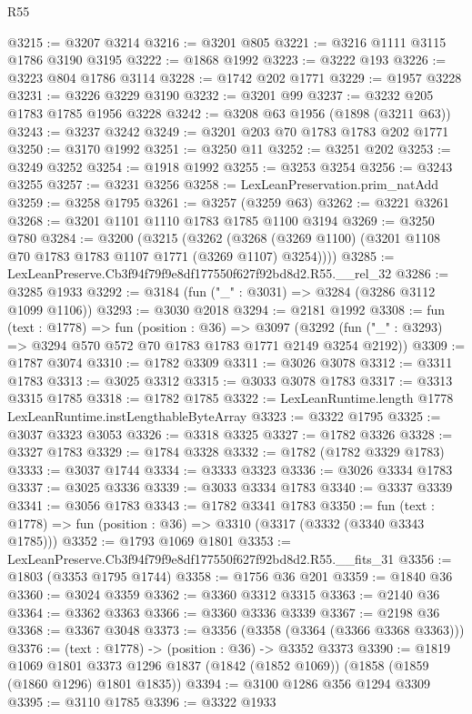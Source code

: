 \begin{lexlean}{R55}
\begin{coremodule}
@3215 := @3207 @3214
@3216 := @3201 @805
@3221 := @3216 @1111 @3115 @1786 @3190 @3195
@3222 := @1868 @1992
@3223 := @3222 @193
@3226 := @3223 @804 @1786 @3114
@3228 := @1742 @202 @1771
@3229 := @1957 @3228
@3231 := @3226 @3229 @3190
@3232 := @3201 @99
@3237 := @3232 @205 @1783 @1785 @1956 @3228
@3242 := @3208 @63 @1956 (@1898 (@3211 @63))
@3243 := @3237 @3242
@3249 := @3201 @203 @70 @1783 @1783 @202 @1771
@3250 := @3170 @1992
@3251 := @3250 @11
@3252 := @3251 @202
@3253 := @3249 @3252
@3254 := @1918 @1992
@3255 := @3253 @3254
@3256 := @3243 @3255
@3257 := @3231 @3256
@3258 := LexLeanPreservation.prim_natAdd
@3259 := @3258 @1795
@3261 := @3257 (@3259 @63)
@3262 := @3221 @3261
@3268 := @3201 @1101 @1110 @1783 @1785 @1100 @3194
@3269 := @3250 @780
@3284 := @3200
    (@3215
      (@3262 (@3268 (@3269 @1100) (@3201 @1108 @70 @1783 @1783 @1107 @1771 (@3269 @1107) @3254))))
@3285 := LexLeanPreserve.Cb3f94f79f9e8df177550f627f92bd8d2.R55.__rel_32
@3286 := @3285 @1933
@3292 := @3184 (fun ("_" : @3031) => @3284 (@3286 @3112 @1099 @1106))
@3293 := @3030 @2018
@3294 := @2181 @1992
@3308 := fun (text : @1778) =>
  fun (position : @36) =>
  @3097 (@3292 (fun ("_" : @3293) => @3294 @570 @572 @70 @1783 @1783 @1771 @2149 @3254 @2192))
@3309 := @1787 @3074
@3310 := @1782 @3309
@3311 := @3026 @3078
@3312 := @3311 @1783
@3313 := @3025 @3312
@3315 := @3033 @3078 @1783
@3317 := @3313 @3315 @1785
@3318 := @1782 @1785
@3322 := LexLeanRuntime.length @1778 LexLeanRuntime.instLengthableByteArray
@3323 := @3322 @1795
@3325 := @3037 @3323 @3053
@3326 := @3318 @3325
@3327 := @1782 @3326
@3328 := @3327 @1783
@3329 := @1784 @3328
@3332 := @1782 (@1782 @3329 @1783)
@3333 := @3037 @1744
@3334 := @3333 @3323
@3336 := @3026 @3334 @1783
@3337 := @3025 @3336
@3339 := @3033 @3334 @1783
@3340 := @3337 @3339
@3341 := @3056 @1783
@3343 := @1782 @3341 @1783
@3350 := fun (text : @1778) => fun (position : @36) => @3310 (@3317 (@3332 (@3340 @3343 @1785)))
@3352 := @1793 @1069 @1801
@3353 := LexLeanPreserve.Cb3f94f79f9e8df177550f627f92bd8d2.R55.__fits_31
@3356 := @1803 (@3353 @1795 @1744)
@3358 := @1756 @36 @201
@3359 := @1840 @36
@3360 := @3024 @3359
@3362 := @3360 @3312 @3315
@3363 := @2140 @36
@3364 := @3362 @3363
@3366 := @3360 @3336 @3339
@3367 := @2198 @36
@3368 := @3367 @3048
@3373 := @3356 (@3358 (@3364 (@3366 @3368 @3363)))
@3376 := (text : @1778) -> (position : @36) -> @3352 @3373
@3390 := @1819
    @1069
    @1801
    @3373
    @1296
    @1837
    (@1842 (@1852 @1069))
    (@1858 (@1859 (@1860 @1296) @1801 @1835))
@3394 := @3100 @1286 @356 @1294 @3309
@3395 := @3110 @1785
@3396 := @3322 @1933

\end{coremodule}
\end{lexlean}
